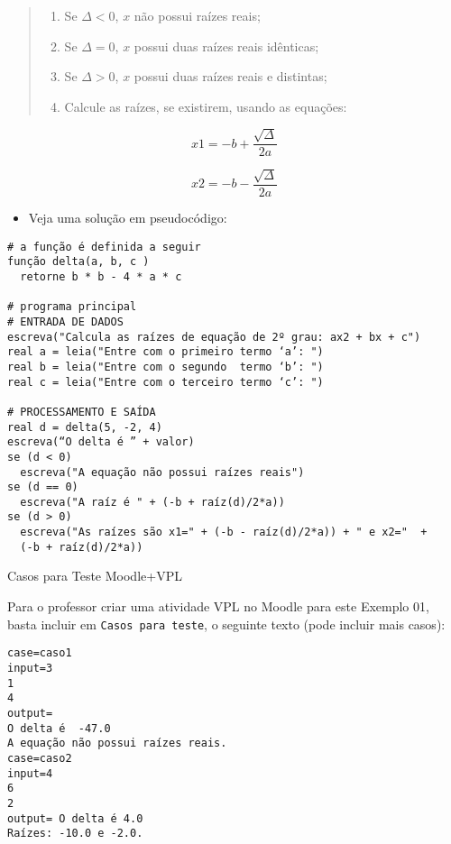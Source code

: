 \documentclass[12pt,a4paper]{article}
\providecommand{\tightlist}{%
      \setlength{\itemsep}{0pt}\setlength{\parskip}{0pt}}
\begin{document}
\begin{quote}
\begin{enumerate}
\def\labelenumi{\arabic{enumi}.}
\tightlist
\item
  Se \(\Delta<0\), \(x\) não possui raízes reais;
\item
  Se \(\Delta=0\), \(x\) possui duas raízes reais idênticas;
\item
  Se \(\Delta>0\), \(x\) possui duas raízes reais e distintas;
\item
  Calcule as raízes, se existirem, usando as equações:
\end{enumerate}
\end{quote}

\[x1 = -b+\frac{\sqrt{\Delta}}{2a}\]

\[x2 = -b-\frac{\sqrt{\Delta}}{2a}\]

\begin{itemize}
\tightlist
\item
  Veja uma solução em pseudocódigo:
\end{itemize}

    \begin{verbatim}
# a função é definida a seguir
função delta(a, b, c )
  retorne b * b - 4 * a * c
 
# programa principal  
# ENTRADA DE DADOS
escreva("Calcula as raízes de equação de 2º grau: ax2 + bx + c")
real a = leia("Entre com o primeiro termo ‘a’: ")
real b = leia("Entre com o segundo  termo ‘b’: ") 
real c = leia("Entre com o terceiro termo ‘c’: ") 
 
# PROCESSAMENTO E SAÍDA
real d = delta(5, -2, 4)
escreva(“O delta é ” + valor)
se (d < 0)  
  escreva("A equação não possui raízes reais")
se (d == 0) 
  escreva("A raíz é " + (-b + raíz(d)/2*a))
se (d > 0)  
  escreva("As raízes são x1=" + (-b - raíz(d)/2*a)) + " e x2="  + 
  (-b + raíz(d)/2*a))
\end{verbatim}

    Casos para Teste Moodle+VPL

Para o professor criar uma atividade VPL no Moodle para este Exemplo 01,
basta incluir em \texttt{Casos\ para\ teste}, o seguinte texto (pode
incluir mais casos):

\begin{verbatim}
case=caso1
input=3
1
4
output= 
O delta é  -47.0
A equação não possui raízes reais.
case=caso2
input=4
6
2
output= O delta é 4.0
Raízes: -10.0 e -2.0.
\end{verbatim}
\end{document}
